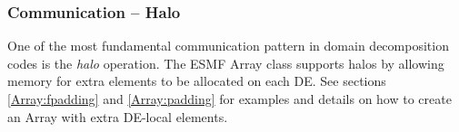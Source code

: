  
\setlength{\oldparskip}{\parskip}
\setlength{\parskip}{1.5ex}
\setlength{\oldparindent}{\parindent}
\setlength{\parindent}{0pt}
\setlength{\oldbaselineskip}{\baselineskip}
\setlength{\baselineskip}{11pt}
 
\def\bv{\begin{verbatim}}
\def\ev{\end{verbatim}}
\def\be{\begin{equation}}
\def\ee{\end{equation}}
\def\bea{\begin{eqnarray}}
\def\eea{\end{eqnarray}}
\def\bi{\begin{itemize}}
\def\ei{\end{itemize}}
\def\bn{\begin{enumerate}}
\def\en{\end{enumerate}}
\def\bd{\begin{description}}
\def\ed{\end{description}}
\def\({\left (}
\def\){\right )}
\def\[{\left [}
\def\]{\right ]}
\def\<{\left  \langle}
\def\>{\right \rangle}
\def\cI{{\cal I}}
\def\diag{\mathop{\rm diag}}
\def\tr{\mathop{\rm tr}}


 

  
   \subsubsection{Communication -- Halo}
   \label{Array:Halo}
   
   One of the most fundamental communication pattern in domain decomposition
   codes is the {\em halo} operation. The ESMF Array class supports halos
   by allowing memory for extra elements to be allocated on each DE. See
   sections \ref{Array:fpadding} and \ref{Array:padding} for examples and
   details on how to create an Array with extra DE-local elements.
  
